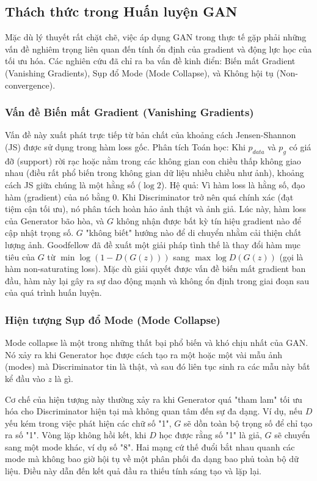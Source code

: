 \newpage
\subsection{Thách thức trong Huấn luyện GAN}
Mặc dù lý thuyết rất chặt chẽ, việc áp dụng GAN trong thực tế gặp phải những vấn đề nghiêm trọng 
liên quan đến tính ổn định của gradient và động lực học của tối ưu hóa. Các nghiên cứu đã chỉ ra 
ba vấn đề kinh điển: Biến mất Gradient (Vanishing Gradients), Sụp đổ Mode (Mode Collapse), và 
Không hội tụ (Non-convergence).

\subsubsection{Vấn đề Biến mất Gradient (Vanishing Gradients)}
Vấn đề này xuất phát trực tiếp từ bản chất của khoảng cách Jensen-Shannon (JS) được sử dụng trong 
hàm loss gốc. Phân tích Toán học: Khi $p_{data}$ và $p_g$ có giá đỡ (support) rời rạc hoặc nằm 
trong các không gian con chiều thấp không giao nhau (điều rất phổ biến trong không gian dữ liệu 
nhiều chiều như ảnh), khoảng cách JS giữa chúng là một hằng số ($\log 2$).
Hệ quả: Vì hàm loss là hằng số, đạo hàm (gradient) của nó bằng 0. Khi Discriminator trở nên 
quá chính xác (đạt tiệm cận tối ưu), nó phân tách hoàn hảo ảnh thật và ảnh giả. Lúc này, hàm 
loss của Generator bão hòa, và $G$ không nhận được bất kỳ tín hiệu gradient nào để cập nhật 
trọng số. $G$ "không biết" hướng nào để di chuyển nhằm cải thiện chất lượng ảnh.
Goodfellow đã đề xuất một giải pháp tình thế là thay đổi hàm mục tiêu của $G$ 
từ $\min \log(1 - D(G(z)))$ sang $\max \log D(G(z))$ (gọi là hàm non-saturating loss). 
Mặc dù giải quyết được vấn đề biến mất gradient ban đầu, hàm này lại gây ra sự dao động 
mạnh và không ổn định trong giai đoạn sau của quá trình huấn luyện.\cite{Goodfellow2014}

\subsubsection{Hiện tượng Sụp đổ Mode (Mode Collapse)}

Mode collapse là một trong những thất bại phổ biến và khó chịu nhất của GAN. Nó xảy ra khi 
Generator học được cách tạo ra một hoặc một vài mẫu ảnh (modes) mà Discriminator tin là thật, 
và sau đó liên tục sinh ra các mẫu này bất kể đầu vào $z$ là gì.\cite{Salimans2016}

Cơ chế của hiện tượng này thường xảy ra khi Generator quá "tham lam" tối ưu hóa cho 
Discriminator hiện tại mà không quan tâm đến sự đa dạng. Ví dụ, nếu $D$ yếu kém trong 
việc phát hiện các chữ số "1", $G$ sẽ dồn toàn bộ trọng số để chỉ tạo ra số "1".
Vòng lặp không hồi kết, khi $D$ học được rằng số "1" là giả, $G$ sẽ chuyển sang một mode 
khác, ví dụ số "8". Hai mạng cứ thế đuổi bắt nhau quanh các mode mà không bao giờ hội tụ 
về một phân phối đa dạng bao phủ toàn bộ dữ liệu. Điều này dẫn đến kết quả đầu ra thiếu tính
sáng tạo và lặp lại.

